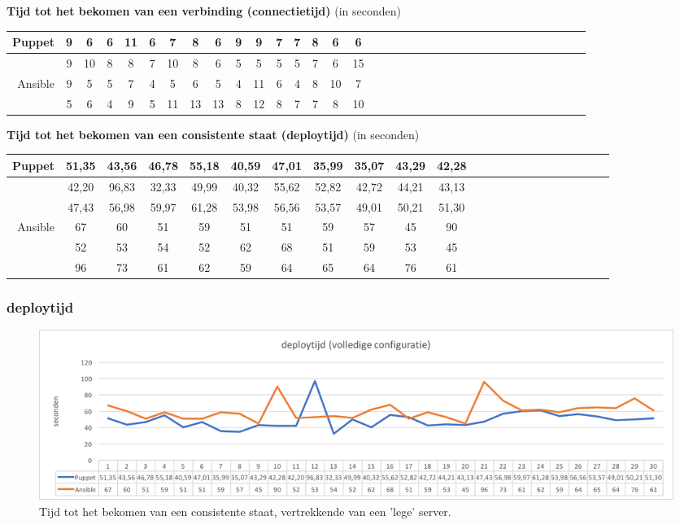\textbf{Tijd tot het bekomen van een verbinding (\gls{connectietijd})} (in seconden) \newline
\begin{tabular}{| r |c |c |c |c |c |c |c |c |c |c |c |c |c |c |c |c |c |c |c |c |c |c |c |c |c |c |c |c |c |c |c |c |c |c |}
  \hline	  		
Puppet & 9 & 6 & 6 & 11 & 6 & 7 & 8 & 6 & 9 & 9 & 7 & 7 & 8 & 6 & 6   \\ 
\hline
& 9 & 10 & 8 & 8 & 7 & 10 & 8 & 6 & 5 & 5 & 5 & 5 & 7 & 6 & 15\\
   \hline    \hline
  Ansible & 9 & 5 & 5 & 7 & 4 & 5 & 6 & 5 & 4 & 11 & 6 & 4 & 8 & 10 & 7 \\ 
\hline
   & 5 & 6 & 4 & 9 & 5 & 11 & 13 & 13 & 8 & 12 & 8 &	7 & 7 & 8  & 10 \\
  \hline  
\end{tabular}


\textbf{Tijd tot het bekomen van een consistente staat (\gls{deploytijd})} (in seconden)

\begin{tabular}{| r |c |c |c |c |c |c |c |c |c |c |c |c |c |c |c |c |c |c |c |c | c c |}
  \hline			
  
Puppet & 51,35 & 43,56 & 46,78 & 55,18 & 40,59 & 47,01 & 35,99 & 35,07 & 43,29 & 42,28  \\ \hline
           & 42,20 & 96,83 & 32,33 & 49,99 & 40,32 & 55,62 & 52,82 & 42,72 & 44,21 & 43,13 \\ \hline
            & 47,43 & 56,98	& 59,97 & 61,28 & 53,98	& 56,56 & 53,57 & 49,01 & 50,21 & 51,30 \\ \hline
              \hline 
   
  Ansible & 67 & 60 & 51 & 59 & 51 & 51 & 59 & 57 & 45 & 90 \\ \hline
                & 52  & 53 & 54 & 52 & 62 & 68 & 51 & 59 & 53 & 45  \\ \hline
                & 96 & 73 & 61 & 62	& 59 & 64	& 65 & 64 & 76 & 61  \\ \hline
                
  \hline  
\end{tabular}


\subsubsection{\gls{deploytijd}}
\begin{figure}
  \includegraphics[width=\linewidth]{img/deploytime_fullconfig.png} 
  \caption{Tijd tot het bekomen van een consistente staat, vertrekkende van een 'lege' server.}  
  \label{fig:deploytime_fullconfig}
\end{figure}

